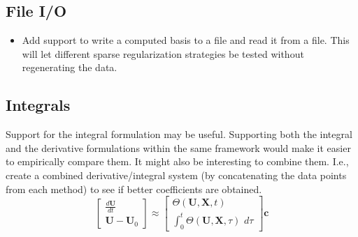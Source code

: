 \documentclass{article}
\let\vec\mathbf
\begin{document}
\subsection{File I/O}

\begin{itemize}
    \item Add support to write a computed basis to a file and read it from a
      file. This will let different sparse regularization strategies be tested
      without regenerating the data.
\end{itemize}

\subsection{Integrals}

Support for the integral formulation may be useful. Supporting both the integral
and the derivative formulations within the same framework would make it easier
to empirically compare them. It might also be interesting to combine them. I.e.,
create a combined derivative/integral system (by concatenating the data points
from each method) to see if better coefficients are obtained.
\begin{equation*}
\begin{bmatrix}
\frac{d\vec{U}}{dt} \\ \vec{U} - \vec{U}_0
\end{bmatrix}
\approx
\begin{bmatrix}
\Theta(\vec{U}, \vec{X}, t) \\ \int_0^t \Theta(\vec{U}, \vec{X}, \tau) \,\, d\tau
\end{bmatrix}
\vec{c}
\end{equation*}



\end{document}
